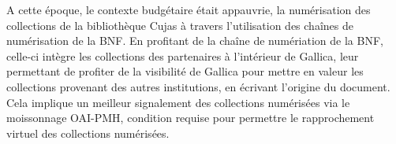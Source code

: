 A cette époque, le contexte budgétaire était appauvrie, la numérisation des collections de la bibliothèque Cujas à travers l'utilisation des chaînes de numérisation de la BNF. En profitant de la chaîne de numériation de la BNF, celle-ci intègre les collections des partenaires à l'intérieur de Gallica, leur permettant de profiter de la visibilité de Gallica pour mettre en valeur les collections provenant des autres institutions, en écrivant l'origine du document. Cela implique un meilleur signalement des collections numérisées via le moissonnage OAI-PMH, condition requise pour permettre le rapprochement virtuel des collections numérisées.
